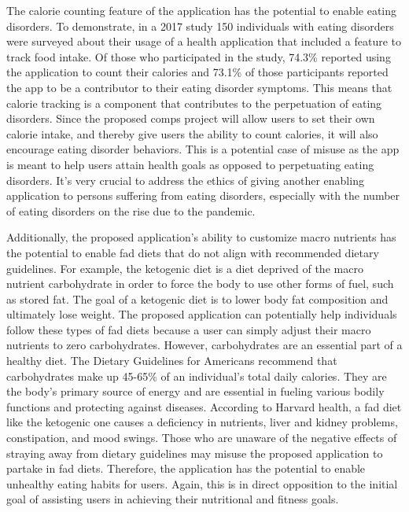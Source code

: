 \documentclass[10pt,twocolumn]{article}
\begin{document}
The calorie counting feature of the application has the potential to enable eating disorders. To demonstrate, in a 2017 study 150 individuals with eating disorders were surveyed about their usage of a health application that included a feature to track food intake.\cite{psyd} Of those who participated in the study, 74.3\% reported using the application to count their calories and 73.1\% of those participants reported the app to be a contributor to their eating disorder symptoms. This means that calorie tracking is a component that contributes to the perpetuation of eating disorders. Since the proposed comps project will allow users to set their own calorie intake, and thereby give users the ability to count calories, it will also encourage eating disorder behaviors. This is a potential case of misuse as the app is meant to help users attain health goals as opposed to perpetuating eating disorders. It's very crucial to address the ethics of giving another enabling application to persons suffering from eating disorders, especially with the number of eating disorders on the rise due to the pandemic.\cite{katella_2021}

Additionally, the proposed application’s ability to customize macro nutrients has the potential to enable fad diets that do not align with recommended dietary guidelines. For example, the ketogenic diet is a diet deprived of the macro nutrient carbohydrate in order to force the body to use other forms of fuel, such as stored fat. The goal of a ketogenic diet is to lower body fat composition and ultimately lose weight. The proposed application can potentially help individuals follow these types of fad diets because a user can simply adjust their macro nutrients to zero carbohydrates. However, carbohydrates are an essential part of a healthy diet. The Dietary Guidelines for Americans recommend that carbohydrates make up 45-65\% of an individual’s total daily calories. They are the body’s primary source of energy and are essential in fueling various bodily functions and protecting against diseases.\cite{mayo_clinic_2022} According to Harvard health, a fad diet like the ketogenic one causes a deficiency in nutrients, liver and kidney problems, constipation, and mood swings.\cite{harvard_health_2020} Those who are unaware of the negative effects of straying away from dietary guidelines may misuse the proposed application to partake in fad diets. Therefore, the application has the potential to enable unhealthy eating habits for users. Again, this is in direct opposition to the initial goal of assisting users in achieving their nutritional and fitness goals. 
\end{document}

